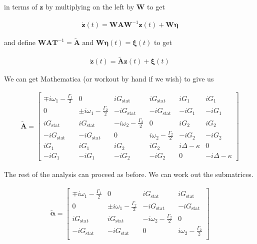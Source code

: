 \documentclass[12pt]{article}
\newcommand{\bv}[1]{\boldsymbol{#1}}
\begin{document}
in terms of $\bv{z}$ by multiplying on the left by $\bv{W}$ to get

\begin{align}
\dot{\bv{z}}(t) = \bv{W}\bv{A}\bv{W}^{-1}\bv{z}(t) + \bv{W}\bv{\eta}
\end{align}

and define $\bv{W}\bv{A}\bv{T}^{-1} = \tilde{\bv{A}}$ and $\bv{W}\bv{\eta}(t) = \bv{\xi}(t)$ to get

\begin{align}
\dot{\bv{z}}(t) = \tilde{\bv{A}}\bv{z}(t) + \bv{\xi}(t)
\end{align}

We can get Mathematica (or workout by hand if we wish) to give us

\begin{align}
\tilde{\bv{A}} = 
\begin{bmatrix}
\mp i\omega_1 - \frac{\Gamma_1}{2} & 0 & iG_{\text{stat}} & iG_{\text{stat}} & iG_1 & iG_1\\
0 & \pm i\omega_1 - \frac{\Gamma_2}{2} & -iG_{\text{stat}} & -iG_{\text{stat}} & -iG_1 & -i G_1\\
i G_{\text{stat}} & iG_{\text{stat}} & -i\omega_2 - \frac{\Gamma_2}{2} & 0 & iG_2 & iG_2\\
-i G_{\text{stat}} & -iG_{\text{stat}} & 0 & i\omega_2 - \frac{\Gamma_2}{2} & -iG_2 & -iG_2\\
iG_1 & iG_1 & iG_2 & iG_2 & i\Delta-\kappa & 0\\
-iG_1 & -iG_1 & -iG_2 & -iG_2 & 0 & -i\Delta - \kappa
\end{bmatrix}
\end{align}

The rest of the analysis can proceed as before. We can work out the submatrices.

\begin{align}
\tilde{\bv{\alpha}} = 
\begin{bmatrix}
\mp i\omega_1 - \frac{\Gamma_1}{2} & 0 & iG_{\text{stat}} & iG_{\text{stat}}\\
0 & \pm i\omega_1 - \frac{\Gamma_2}{2} & -iG_{\text{stat}} & -iG_{\text{stat}}\\
i G_{\text{stat}} & iG_{\text{stat}} & -i\omega_2 - \frac{\Gamma_2}{2} & 0\\
-i G_{\text{stat}} & -iG_{\text{stat}} & 0 & i\omega_2 - \frac{\Gamma_2}{2}\\
\end{bmatrix}
\end{align}
\end{document}
